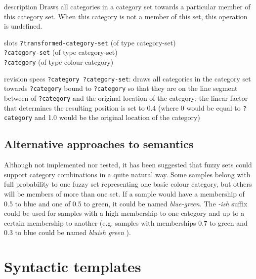 
\begin{explanation}{description}
  Draws all categories in a category set towards a particular member
  of this category set. When this category is not a member of this
  set, this operation is undefined.
\end{explanation}

\begin{explanation}{slots}
  \verb+?transformed-category-set+ (of type category-set) \\
  \verb+?category-set+ (of type category-set) \\
  \verb+?category+ (of type colour-category)
\end{explanation}

\begin{explanation}{revision specs}
  \verb+?category ?category-set+: draws all categories in the category
  set towards \verb+?category+ bound to \verb+?category+ so that they
  are on the line segment between of \verb+?category+ and the original
  location of the category; the linear factor that determines the
  resulting position is set to 0.4 (where 0 would be equal to
  \verb+?category+ and 1.0 would be the original location of the
  category)
\end{explanation}

\subsection{Alternative approaches to semantics}

Although not implemented nor tested, it has been suggested that fuzzy
sets could support category combinations in a quite natural way. Some
samples belong with full probability to one fuzzy set representing one
basic colour category, but others will be members of more than one
set. If a sample would have a membership of 0.5 to blue and one of 0.5 to
green, it could be named \textit{blue-green}. The \textit{-ish} suffix could be
used for samples with a high membership to one category and up to a
certain membership to another (e.g. samples with memberships 0.7 to
green and 0.3 to blue could be named \textit{bluish green}
\citep{benavente08parametric}).

\section{Syntactic templates}

